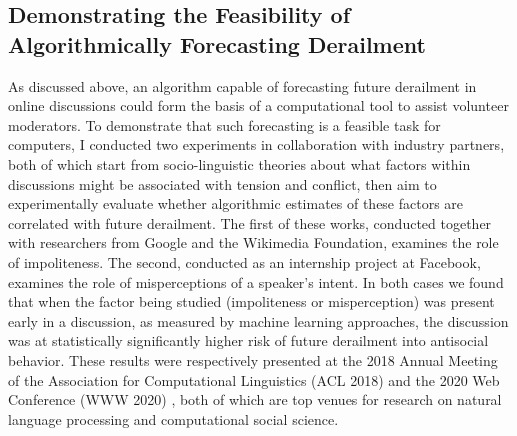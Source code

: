 \documentclass[11pt,letterpaper]{article}
\begin{document}
\subsection{Demonstrating the Feasibility of Algorithmically Forecasting Derailment}
As discussed above, an algorithm capable of forecasting future derailment in online discussions could form the basis of a computational tool to assist volunteer moderators.
To demonstrate that such forecasting is a feasible task for computers, I conducted two experiments in collaboration with industry partners, both of which start from socio-linguistic theories about what factors within discussions might be associated with tension and conflict, then aim to experimentally evaluate whether algorithmic estimates of these factors are correlated with future derailment.
The first of these works, conducted together with researchers from Google and the Wikimedia Foundation, examines the role of impoliteness.
The second, conducted as an internship project at Facebook, examines the role of misperceptions of a speaker's intent.
In both cases we found that when the factor being studied (impoliteness or misperception) was present early in a discussion, as measured by machine learning approaches, the discussion was at statistically significantly higher risk of future derailment into antisocial behavior.
These results were respectively presented at the 2018 Annual Meeting of the Association for Computational Linguistics (ACL 2018) \cite{zhang_conversations_2018} and the 2020 Web Conference (WWW 2020) \cite{chang_dont_2020}, both of which are top venues for research on natural language processing and computational social science.
\end{document}
